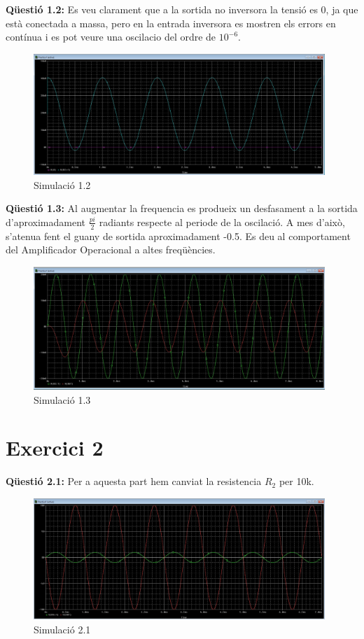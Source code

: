 \documentclass[12pt, a4papre]{article}
\begin{document}
	\textbf{Qüestió 1.2:} Es veu clarament que a la sortida no inversora la tensió es 0, ja que està conectada a massa, pero en la entrada inversora es mostren els errors en contínua i es pot veure una oscilacio del ordre de $10^{-6}$.
	\begin{figure}[H]
		\begin{center}
		\includegraphics[width=110mm]{Captura_1.2.PNG}
		\caption{Simulació 1.2}
		\end{center}
	\end{figure}
	
	\textbf{Qüestió 1.3:} Al augmentar la frequencia es produeix un desfasament a la sortida d'aproximadament $\frac{pi}{2}$ radiants respecte al periode de la oscilació. A mes d'això, s'atenua fent el guany de sortida aproximadament -0.5. Es deu al comportament del Amplificador Operacional a altes freqüències.
	
	\begin{figure}[H]
		\begin{center}
		\includegraphics[width=110mm]{Captura_1.3.PNG}
		\caption{Simulació 1.3}
		\end{center}
	\end{figure}
	
	\section{Exercici 2}
	
	\textbf{Qüestió 2.1:} Per a aquesta part hem canviat la resistencia $R_2$ per 10k.
	\begin{figure}[H]
		\begin{center}
		\includegraphics[width=110mm]{Captura_2.1.PNG}
		\caption{Simulació 2.1}
		\end{center}
	\end{figure}
	
\end{document}
